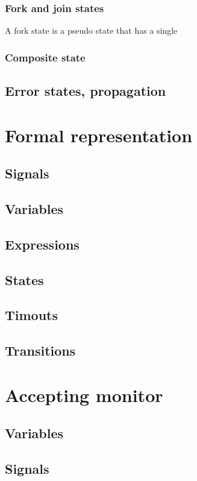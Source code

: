{    \subsubsection{Fork and join states}
A fork state is a pseudo state that has a single 
    \subsubsection{Composite state}
    
    


  \subsection{Error states, propagation}
\section{Formal representation}
  \subsection{Signals}
  \subsection{Variables}
  \subsection{Expressions}
  \subsection{States}
  \subsection{Timouts}
  \subsection{Transitions}
\section{Accepting monitor}
  \subsection{Variables}
  \subsection{Signals}
}
